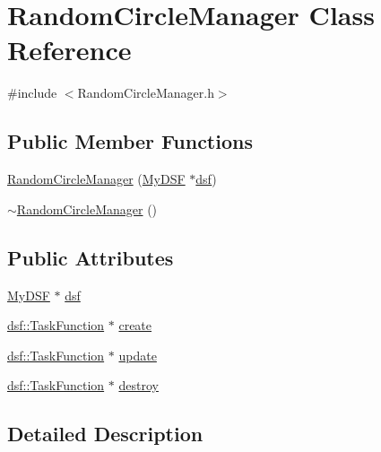 \hypertarget{class_random_circle_manager}{}\section{Random\+Circle\+Manager Class Reference}
\label{class_random_circle_manager}


{\ttfamily \#include $<$Random\+Circle\+Manager.\+h$>$}

\subsection*{Public Member Functions}
\begin{DoxyCompactItemize}
\item 
\hyperlink{class_random_circle_manager_aa16cf845cb91227bd58709fa4ee44c2c}{Random\+Circle\+Manager} (\hyperlink{class_my_d_s_f}{My\+D\+S\+F} $\ast$\hyperlink{class_random_circle_manager_acd654c100c962b48a97aff05fdf3aa5d}{dsf})
\item 
\hyperlink{class_random_circle_manager_aa45606f5a7e53c08e6ca15702fa118d3}{$\sim$\+Random\+Circle\+Manager} ()
\end{DoxyCompactItemize}
\subsection*{Public Attributes}
\begin{DoxyCompactItemize}
\item 
\hyperlink{class_my_d_s_f}{My\+D\+S\+F} $\ast$ \hyperlink{class_random_circle_manager_acd654c100c962b48a97aff05fdf3aa5d}{dsf}
\item 
\hyperlink{namespacedsf_aa16e735f29587f4485b56fc46746f7a9}{dsf\+::\+Task\+Function} $\ast$ \hyperlink{class_random_circle_manager_a5df9bb06afdb248a8400f4f708c16f0b}{create}
\item 
\hyperlink{namespacedsf_aa16e735f29587f4485b56fc46746f7a9}{dsf\+::\+Task\+Function} $\ast$ \hyperlink{class_random_circle_manager_a05c52359eec88a70be1296bfbeeb17c7}{update}
\item 
\hyperlink{namespacedsf_aa16e735f29587f4485b56fc46746f7a9}{dsf\+::\+Task\+Function} $\ast$ \hyperlink{class_random_circle_manager_af87d7d788cd9c4a1a37a30ad959cc445}{destroy}
\end{DoxyCompactItemize}


\subsection{Detailed Description}


